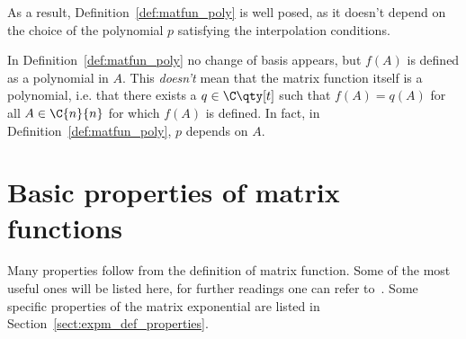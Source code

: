 As a result, Definition~\ref{def:matfun_poly} is well posed, as it doesn't depend on the choice of the polynomial $p$ satisfying the interpolation conditions. 

\begin{oss*}
	In Definition~\ref{def:matfun_poly} no change of basis appears, but $f(A)$ is defined as a polynomial in $A$. This \emph{doesn't} mean that the matrix function itself is a polynomial, i.e. that there exists a $q\in\C\qty[t]$ such that $f(A)=q(A)$ for all $A\in\C{n}{n}$ for which $f(A)$ is defined. In fact, in Definition~\ref{def:matfun_poly}, $p$ depends on $A$.
\end{oss*}


\section{Basic properties of matrix functions}
Many properties follow from the definition of matrix function. Some of the most useful ones will be listed here, for further readings one can refer to~\cite[§~1.3]{higham:matfun_book}. Some specific properties of the matrix exponential are listed in Section~\vref{sect:expm_def_properties}.

